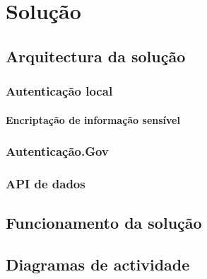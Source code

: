 \cleardoublepage
\chapter{Solução}

\section{Arquitectura da solução}

\subsection{Autenticação local}
\subsubsection{Encriptação de informação sensível}

\subsection{Autenticação.Gov}
\subsection{API de dados}

\section{Funcionamento da solução}

\section{Diagramas de actividade}